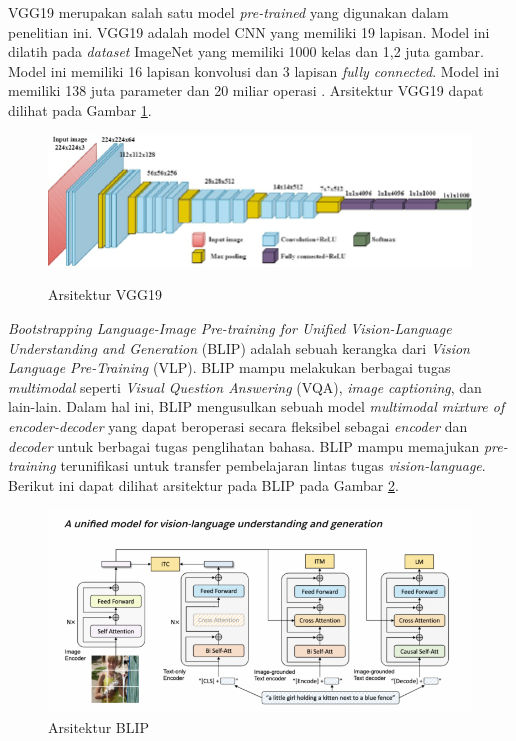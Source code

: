 \par VGG19 merupakan salah satu model \textit{pre-trained} yang digunakan dalam penelitian ini. VGG19 adalah model CNN yang memiliki 19 lapisan. Model ini dilatih pada \textit{dataset} ImageNet yang memiliki 1000 kelas dan 1,2 juta gambar. Model ini memiliki 16 lapisan konvolusi dan 3 lapisan \textit{fully connected}. Model ini memiliki 138 juta parameter dan 20 miliar operasi \citep{simonyan2014very}. Arsitektur VGG19 dapat dilihat pada Gambar \ref{Arsitektur VGG19}.


\begin{figure}[H]
    \centering
    {\includegraphics [width=\textwidth]{image/bab2/vgg19.jpeg}}
    \caption{Arsitektur VGG19 \citep{nguyen2022vgg} }
    \label{Arsitektur VGG19}
\end{figure}

\par \textit{Bootstrapping Language-Image Pre-training for Unified Vision-Language Understanding and Generation} (BLIP) adalah sebuah kerangka dari \textit{Vision Language Pre-Training} (VLP). BLIP mampu melakukan berbagai tugas \textit{multimodal} seperti \textit{Visual Question Answering} (VQA), \textit{image captioning}, dan lain-lain. Dalam hal ini, BLIP mengusulkan sebuah model \textit{multimodal mixture of encoder-decoder} yang dapat beroperasi secara fleksibel sebagai \textit{encoder} dan \textit{decoder} untuk berbagai tugas penglihatan bahasa. BLIP mampu memajukan \textit{pre-training} terunifikasi untuk transfer pembelajaran lintas tugas \textit{vision-language}. Berikut ini dapat dilihat arsitektur pada BLIP pada Gambar \ref{Arsitektur BLIP}.

\begin{figure}[H]
    \centering
    \includegraphics[width=\textwidth]{image/bab2/arsitektur-blip.png}
    \caption{Arsitektur BLIP \citep{li2022blip}}
    \label{Arsitektur BLIP}
\end{figure}

